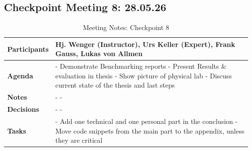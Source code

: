 \subsection{Checkpoint Meeting 8: 28.05.26}\label{subsec:checkpoint-meeting-8}

\begin{table}[H]
    \centering
    \begin{tabular}{p{2.5cm} | p{10cm}}

        \textbf{Participants} &
        Hj. Wenger (Instructor), Urs Keller (Expert), Frank Gauss, Lukas von Allmen\\[6pt]
        \hline

        \textbf{Agenda} &
        - Demonstrate Benchmarking reports \newline
        - Present Results \& evaluation in thesis \newline
        - Show picture of physical lab \newline
        - Discuss current state of the thesis and last steps \\
        \hline

        \textbf{Notes} &
        - \newline
        - \\
        \hline

        \textbf{Decisions} &
        - \newline
        - \\
        \hline

        \textbf{Tasks} &
        - Add one technical and one personal part in the conclusion\newline
        - Move code snippets from the main part to the appendix, unless they are critical\\

    \end{tabular}
    \caption{Meeting Notes: Checkpoint 8}
    \label{tab:meeting-notes-checkpoint-8}
\end{table}
